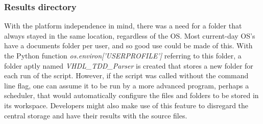 \documentclass[11pt,british]{article}
\begin{document}
\subsubsection{Results directory}
With the platform independence in mind, there was a need for a folder that always stayed in the same location, regardless of the \gls{OS}. Most current-day OS's have a documents folder per user, and so good use could be made of this. With the Python function \emph{os.environ['USERPROFILE']} referring to this folder, a folder aptly named \emph{VHDL\_TDD\_Parser} is created that stores a new folder for each run of the script. However, if the script was called without the command line flag, one can assume it to be run by a more advanced program, perhaps a scheduler, that would automatically configure the files and folders to be stored in its workspace. Developers might also make use of this feature to disregard the central storage and have their results with the source files.
\end{document}
